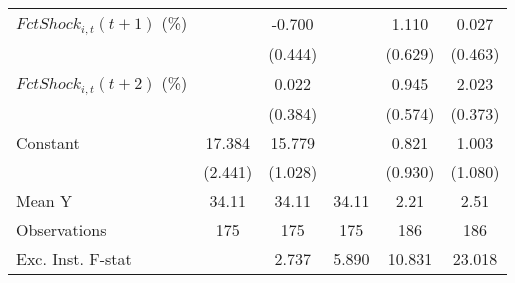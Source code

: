 {\begin{tabular}{l*{5}{c}}
\addlinespace
$ FctShock_{i,t}(t+1)$ (\%)&                     &      -0.700         &                     &       1.110         &       0.027         \\
                    &                     &     (0.444)         &                     &     (0.629)         &     (0.463)         \\
\addlinespace
$ FctShock_{i,t}(t+2)$ (\%)&                     &       0.022         &                     &       0.945         &       2.023\sym{***}\\
                    &                     &     (0.384)         &                     &     (0.574)         &     (0.373)         \\
\addlinespace
Constant            &      17.384\sym{***}&      15.779\sym{***}&                     &       0.821         &       1.003         \\
                    &     (2.441)         &     (1.028)         &                     &     (0.930)         &     (1.080)         \\
\midrule
Mean Y              &       34.11         &       34.11         &       34.11         &        2.21         &        2.51         \\
Observations        &         175         &         175         &         175         &         186         &         186         \\
Exc. Inst. F-stat   &                     &       2.737         &       5.890         &      10.831         &      23.018         \\
\bottomrule
\end{tabular}
}
